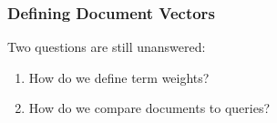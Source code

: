 \documentclass[svgnames]{beamer}
\begin{document}


\begin{frame} \frametitle{Defining Document Vectors}
  
  \begin{block}{Two questions are still unanswered:}
    \begin{enumerate}
    \item How do we define term weights?
    \item How do we compare documents to queries?
    \end{enumerate}
  \end{block}

\end{frame}
\end{document}

